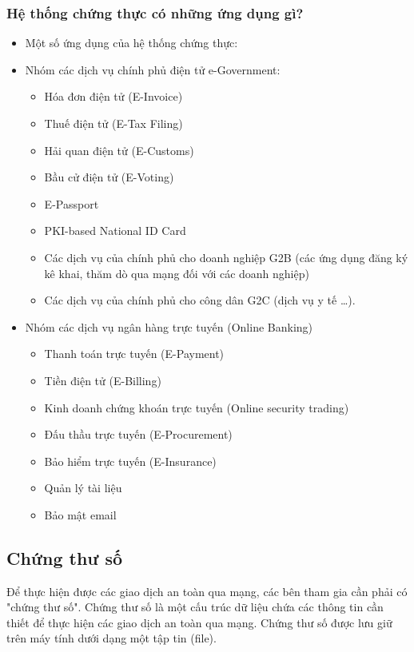 \documentclass[a4paper,12pt]{report}
\begin{document}
\subsubsection{Hệ thống chứng thực có những ứng dụng gì?}
\begin{itemize}
\item Một số ứng dụng của hệ thống chứng thực:
\item Nhóm các dịch vụ chính phủ điện tử e-Government:
\begin{itemize}
\item Hóa đơn điện tử (E-Invoice)
\item Thuế điện tử (E-Tax Filing)
\item Hải quan điện tử (E-Customs)
\item Bầu cử điện tử (E-Voting)
\item E-Passport
\item PKI-based National ID Card
\item Các dịch vụ của chính phủ cho doanh nghiệp G2B (các ứng dụng đăng ký kê khai, thăm dò qua mạng đối với các doanh nghiệp)
\item  Các dịch vụ của chính phủ cho công dân G2C (dịch vụ y tế \ldots).
\end{itemize}
\item Nhóm các dịch vụ ngân hàng trực tuyến (Online Banking)
\begin{itemize}
\item Thanh toán trực tuyến (E-Payment)
\item Tiền điện tử (E-Billing)
\end{itemize}
\begin{itemize}
\item Kinh doanh chứng khoán trực tuyến (Online security trading)
\item Đấu thầu trực tuyến (E-Procurement)
\item Bảo hiểm trực tuyến (E-Insurance)
\item Quản lý tài liệu
\item Bảo mật email
\end{itemize}
\end{itemize}
\subsection*{Chứng thư số}
Để thực hiện được các giao dịch an toàn qua mạng, các bên tham gia cần phải có "chứng thư số". Chứng thư số là một cấu trúc dữ liệu chứa các thông tin cần thiết để thực hiện các giao dịch an toàn qua mạng. Chứng thư số được lưu giữ trên máy tính dưới dạng một tập tin (file).
\end{document}
